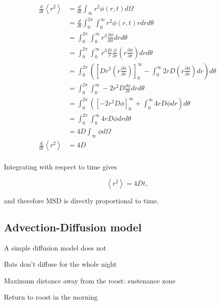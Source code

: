 \documentclass{article}
\newcommand{\D}[2]{\frac{\partial #1}{\partial #2}}
\begin{document}
\begin{equation}
\begin{split}
\frac{d}{dt} \left<r^2\right> &= \frac{d}{dt}\int_{\infty}r^2 \phi(r,t) d\Omega \\
                            &= \frac{d}{dt} \int_0^{2\pi}\int_0^{\infty} r^2 \phi(r,t) r dr d\theta \\
                           &= \int_0^{2\pi} \int_0^{\infty} r^3 \D{\phi}{l t} dr d\theta \\
                            &= \int_0^{2\pi} \int_0^{\infty} r^3 \frac{D}{r} \D{}{r } \left( r \D{ \phi}{ r}\right) dr d\theta \\
                            &= \int_0^{2\pi} \left( \left[ D r^2 \left( r \D{ \phi}{ r}\right) \right]_0^{\infty} - \int_0^{\infty} 2rD \left(r \frac{\partial \phi}{\partial r} \right) dr \right) d\theta \\
                            &= \int_0^{2\pi} \int_0^{\infty} -2r^2D \D{ \phi}{r}dr d\theta \\
                            &= \int_0^{2\pi} \left( \left[-2r^2D \phi \right]_0^{\infty} + \int_0^{\infty} 4rD \phi dr \right)d\theta \\
                            &= \int_0^{2\pi} \int_0^{\infty} 4rD\phi dr d\theta \\
                            &= 4D \int_{\infty} \phi d\Omega \\
\frac{d}{dt} \left<r^2\right>  &= 4D \\
\label{eqn:diffusion_1}
\end{split}
\end{equation}

Integrating with respect to time gives

\begin{equation}
\left<r^2\right> = 4Dt ,
\label{eqn:diffusion_msd}
\end{equation}

and therefore MSD is directly proportional to time.


\subsection{Advection-Diffusion model}

A simple diffusion model does not 

Bats don't diffuse for the whole night

Maximum distance away from the roost: sustenance zone

Return to roost in the morning
\end{document}
